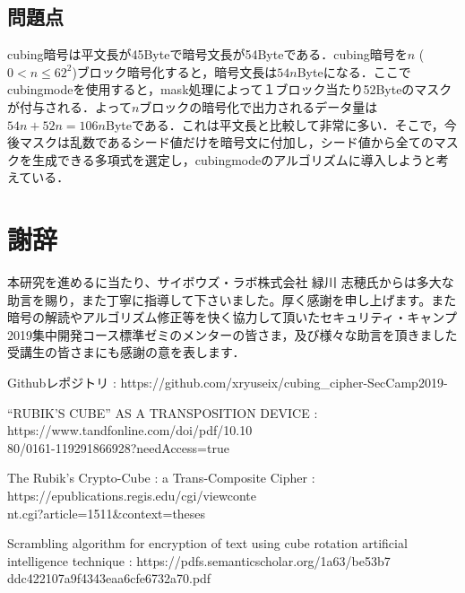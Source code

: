 \documentclass[a4p]{jarticle}
\begin{document}
\subsection{問題点}
cubing暗号は平文長が45Byteで暗号文長が54Byteである．cubing暗号を\(n\) (\(0 < n \leq 62^2\))ブロック暗号化すると，暗号文長は\(54n\)Byteになる．ここでcubingmodeを使用すると，mask処理によって１ブロック当たり52Byteのマスクが付与される．よって\(n\)ブロックの暗号化で出力されるデータ量は\(54n+52n=106n\)Byteである．これは平文長と比較して非常に多い．そこで，今後マスクは乱数であるシード値だけを暗号文に付加し，シード値から全てのマスクを生成できる多項式を選定し，cubingmodeのアルゴリズムに導入しようと考えている．

\section{謝辞}
本研究を進めるに当たり、サイボウズ・ラボ株式会社 緑川 志穂氏からは多大な助言を賜り，また丁寧に指導して下さいました。厚く感謝を申し上げます。また暗号の解読やアルゴリズム修正等を快く協力して頂いたセキュリティ・キャンプ2019集中開発コース標準ゼミのメンターの皆さま，及び様々な助言を頂きました受講生の皆さまにも感謝の意を表します．

\begin{flushleft}
\begin{thebibliography}{}

 Githubレポジトリ : https://github.com/xryuseix/cubing\_cipher-SecCamp2019-

 “RUBIK'S CUBE” AS A TRANSPOSITION DEVICE : https://www.tandfonline.com/doi/pdf/10.10\\80/0161-119291866928?needAccess=true

The Rubik's Crypto-Cube : a Trans-Composite Cipher : https://epublications.regis.edu/cgi/viewconte\\nt.cgi?article=1511\&context=theses

Scrambling algorithm for encryption of text using cube rotation artificial intelligence technique : https://pdfs.semanticscholar.org/1a63/be53b7\\ddc422107a9f4343eaa6cfe6732a70.pdf

\end{thebibliography}
\end{flushleft}
\onecolumn 
\end{document}
